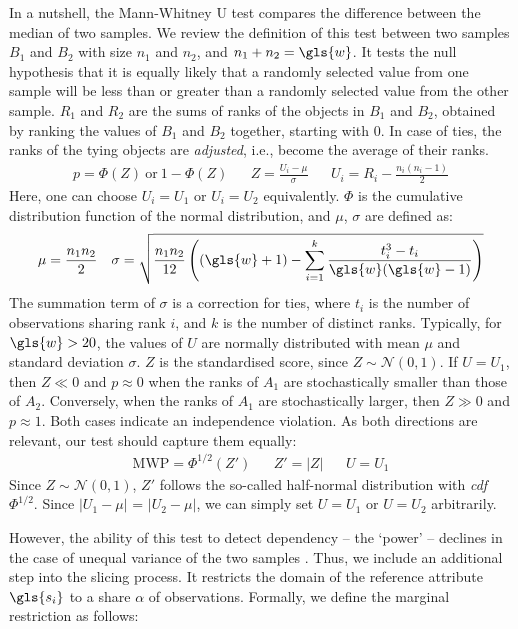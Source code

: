 In a nutshell, the Mann-Whitney U test compares the difference between the median of two samples. We review the definition of this test \cite{Siegel1956} between two samples $B_1$ and $B_2$ with size $n_1$ and $n_2$, and $n_1 + n_2 = \gls{w}$. It tests the null hypothesis that it is equally likely that a randomly selected value from one sample will be less than or greater than a randomly selected value from the other sample. $R_1$ and $R_2$ are the sums of ranks of the objects in $B_1$ and $B_2$, obtained by ranking the values of $B_1$ and $B_2$ together, starting with $0$. In case of ties, the ranks of the tying objects are \textit{adjusted}, i.e., become the average of their ranks. 
\begin{align}
p = \Phi(Z)~\text{or}~1-\Phi(Z) && Z = \frac{ U_i - \mu }{\sigma} && U_i = R_i - \frac{n_i(n_i-1)}{2}
\end{align}
Here, one can choose $U_i = U_1$ or  $U_i = U_2$ equivalently. $\Phi$ is the cumulative distribution function of the normal distribution, and $\mu$, $\sigma$ are defined as: 
\begin{align}
\mu = \frac{n_1 n_2}{2} && \sigma = \sqrt{\frac{n_1 n_2}{12} \left ( (\gls{w}+1) - \sum_{i=1}^{k} \frac{t_i^3 - t_i}{\gls{w}(\gls{w}-1)} \right ) }
\end{align}
The summation term of $\sigma$ is a correction for ties, where $t_i$ is the number of observations sharing rank $i$, and $k$ is the number of distinct ranks.
Typically, for $\gls{w} > 20$, the values of $U$ are normally distributed \cite{Mann1947} with mean $\mu$ and standard deviation $\sigma$. $Z$ is the standardised score, since \mbox{$Z \sim \mathcal{N}(0,1)$}. If $U = U_1$, then $Z \ll 0$ and $p \approx 0$ when the ranks of $A_1$ are stochastically smaller than those of $A_2$. Conversely, when the ranks of $A_1$ are stochastically larger, then $Z \gg 0$ and $p \approx 1$.
Both cases indicate an independence violation. As both directions are relevant, our test should capture them equally: %
\begin{align}
\text{MWP} = \Phi^{1/2}(Z') && Z' = |Z| && U = U_1
\end{align}
Since $Z  \sim \mathcal{N}(0,1)$, $Z'$ follows the so-called half-normal distribution with \textit{cdf} $\Phi^{1/2}$. Since $|U_1 - \mu|$ = $|U_2 - \mu|$, we can simply set $U = U_1$ or $U = U_2$ arbitrarily.%

However, the ability of this test to detect dependency --  the `power' -- declines in the case of unequal variance of the two samples \cite{zimmerman2003warning, fagerland2009wilcoxon}. %
Thus, we include an additional step into the slicing process. 
It restricts the domain of the reference attribute $\gls{s_i}$ to a share $\alpha$ of observations. Formally, we define the marginal restriction as follows: 

